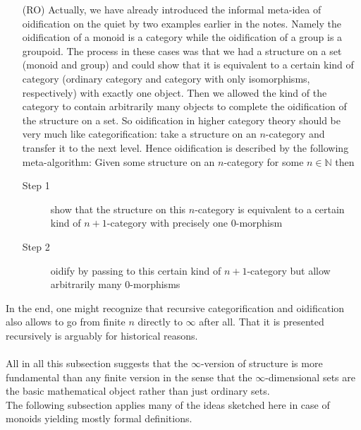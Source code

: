 \begin{enumerate}
\item[(RO)]
Actually, we have already introduced the informal meta-idea of oidification on the quiet by two examples earlier in the notes. Namely the oidification of a monoid is a category while the oidification of a group is a groupoid. The process in these cases was that we had a structure on a set (monoid and group) and could show that it is equivalent to a certain kind of category (ordinary category and category with only isomorphisms, respectively) with exactly one object. Then we allowed the kind of the category to contain arbitrarily many objects to complete the oidification of the structure on a set. So oidification in higher category theory should be very much like categorification: take a structure on an $n$-category and transfer it to the next level. Hence oidification is described by the following meta-algorithm: Given some structure on an $n$-category for some $n \in \mathbb{N}$ then
\begin{description}
\item[Step 1]
show that the structure on this $n$-category is equivalent to a certain kind of $n+1$-category with precisely one $0$-morphism
\item[Step 2]
oidify by passing to this certain kind of $n+1$-category but allow arbitrarily many $0$-morphisms
\end{description}
\end{enumerate}
In the end, one might recognize that recursive categorification and oidification also allows to go from finite $n$ directly to $\infty$ after all. That it is presented recursively is arguably for historical reasons.
\\\\
All in all this subsection suggests that the $\infty$-version of structure is more fundamental than any finite version in the sense that the $\infty$-dimensional sets are the basic mathematical object rather than just ordinary sets.
\\
The following subsection applies many of the ideas sketched here in case of monoids yielding mostly formal definitions.
